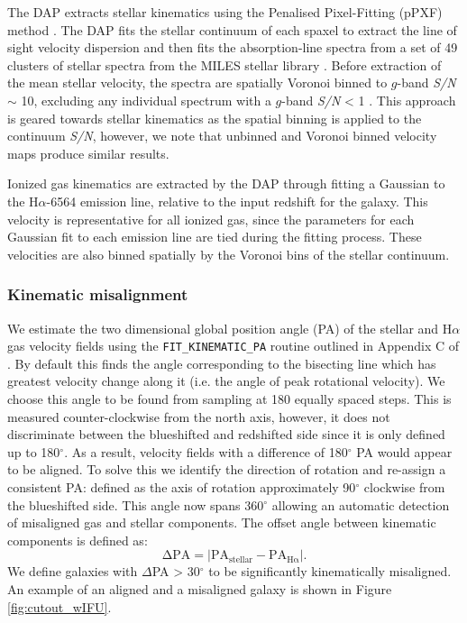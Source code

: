 The DAP extracts stellar kinematics using the Penalised Pixel-Fitting (pPXF) method \citep{cappellari2004,cappellari2017}. The DAP fits the stellar continuum of each spaxel to extract the line of sight velocity dispersion and then fits the absorption-line spectra from a set of 49 clusters of stellar spectra from the MILES stellar library \citep{sanchez2006,falcon2011}. Before extraction of the mean stellar velocity, the spectra are spatially Voronoi binned to $g$-band \textit{S/N} $\sim$ 10, excluding any individual spectrum with a $g$-band \textit{S/N} < 1 \citep{cappellari2003}. This approach is geared towards stellar kinematics as the spatial binning is applied to the continuum \textit{S/N}, however, we note that unbinned and Voronoi binned velocity maps produce similar results. 

Ionized gas kinematics are extracted by the DAP through fitting a Gaussian to the H$\alpha$-6564 emission line, relative to the input redshift for the galaxy. This velocity is representative for all ionized gas, since the parameters for each Gaussian fit to each emission line are tied during the fitting process. These velocities are also binned spatially by the Voronoi bins of the stellar continuum. 

\subsubsection{Kinematic misalignment} \label{sec:kin_mis}
We estimate the two dimensional global position angle (PA) of the stellar and H$\alpha$ gas velocity fields using the \texttt{FIT\_KINEMATIC\_PA} routine outlined in Appendix C of \citet{krajnovic2006}. By default this finds the angle corresponding to the bisecting line which has greatest velocity change along it (i.e. the angle of peak rotational velocity). We choose this angle to be found from sampling at 180 equally spaced steps. This is measured counter-clockwise from the north axis, however, it does not discriminate between the blueshifted and redshifted side since it is only defined up to 180$^{\circ}$. As a result, velocity fields with a difference of 180$^{\circ}$ PA would appear to be aligned. To solve this we identify the direction of rotation and re-assign a consistent PA: defined as the axis of rotation approximately 90$^{\circ}$ clockwise from the blueshifted side. This angle now spans 360$^{\circ}$ allowing an automatic detection of misaligned gas and stellar components. The offset angle between kinematic components is defined as: 
\begin{equation} \label{eq:delPA}
\mathrm{\Delta PA = |PA_{stellar} - PA_{H\alpha}|. }
\end{equation}
We define galaxies with $\Delta$PA > 30$^{\circ}$ to be significantly kinematically misaligned. An example of an aligned and a misaligned galaxy is shown in Figure \ref{fig:cutout_wIFU}. 

